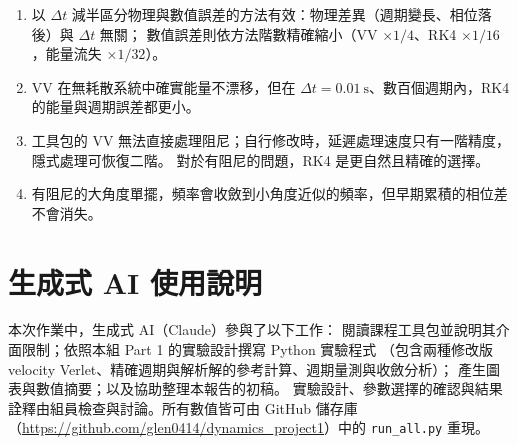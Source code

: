 \documentclass[11pt,a4paper]{article}
\newcommand{\dt}{\Delta t}
\begin{document}
\begin{enumerate}
  \item 以 $\dt$ 減半區分物理與數值誤差的方法有效：物理差異（週期變長、相位落後）與 $\dt$ 無關；
        數值誤差則依方法階數精確縮小（VV $\times1/4$、RK4 $\times1/16$，能量流失 $\times1/32$）。
  \item VV 在無耗散系統中確實能量不漂移，但在 $\dt=0.01~\mathrm{s}$、數百個週期內，RK4 的能量與週期誤差都更小。
  \item 工具包的 VV 無法直接處理阻尼；自行修改時，延遲處理速度只有一階精度，隱式處理可恢復二階。
        對於有阻尼的問題，RK4 是更自然且精確的選擇。
  \item 有阻尼的大角度單擺，頻率會收斂到小角度近似的頻率，但早期累積的相位差不會消失。
\end{enumerate}

\section{生成式 AI 使用說明}

本次作業中，生成式 AI（Claude）參與了以下工作：
閱讀課程工具包並說明其介面限制；依照本組 Part 1 的實驗設計撰寫 Python 實驗程式
（包含兩種修改版 velocity Verlet、精確週期與解析解的參考計算、週期量測與收斂分析）；
產生圖表與數值摘要；以及協助整理本報告的初稿。
實驗設計、參數選擇的確認與結果詮釋由組員檢查與討論。所有數值皆可由 GitHub 儲存庫（\url{https://github.com/glen0414/dynamics_project1}）中的 \texttt{run\_all.py} 重現。
\end{document}
